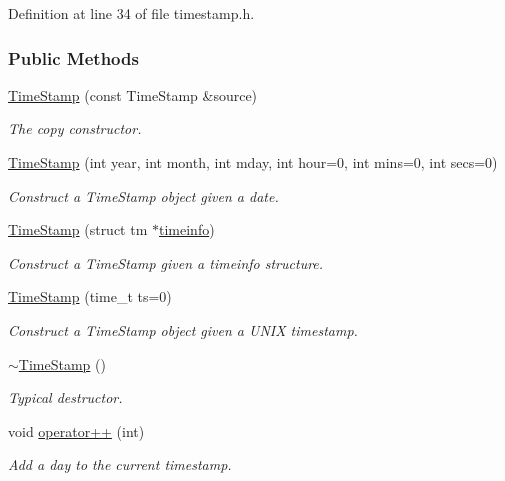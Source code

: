 Definition at line 34 of file timestamp.h.\subsubsection*{Public Methods}
\begin{CompactItemize}
\item 
\hyperlink{classTimeStamp_TimeStampa0}{Time\-Stamp} (const Time\-Stamp \&source)
\begin{CompactList}\small\item\em The copy constructor.\item\end{CompactList}\item 
\hyperlink{classTimeStamp_TimeStampa1}{Time\-Stamp} (int year, int month, int mday, int hour=0, int mins=0, int secs=0)
\begin{CompactList}\small\item\em Construct a Time\-Stamp object given a date.\item\end{CompactList}\item 
\hyperlink{classTimeStamp_TimeStampa2}{Time\-Stamp} (struct tm $\ast$\hyperlink{classTimeStamp_TimeStampo0}{timeinfo})
\begin{CompactList}\small\item\em Construct a Time\-Stamp given a timeinfo structure.\item\end{CompactList}\item 
\hyperlink{classTimeStamp_TimeStampa3}{Time\-Stamp} (time\_\-t ts=0)
\begin{CompactList}\small\item\em Construct a Time\-Stamp object given a UNIX timestamp.\item\end{CompactList}\item 
\hyperlink{classTimeStamp_TimeStampa4}{$\sim$Time\-Stamp} ()
\begin{CompactList}\small\item\em Typical destructor.\item\end{CompactList}\item 
void \hyperlink{classTimeStamp_TimeStampa5}{operator++} (int)
\begin{CompactList}\small\item\em Add a day to the current timestamp.\item\end{CompactList}\item 

\end{CompactItemize}
